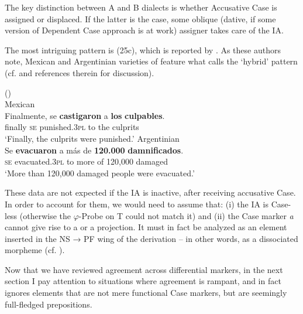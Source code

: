 \documentclass[output=paper]{langsci/langscibook}
\begin{document}


The key distinction between A and B dialects is whether Accusative Case is assigned or displaced. If the latter is the case, some oblique (dative, if some version of  Dependent Case approach is at work) assigner takes care of the IA.

The most intriguing pattern is (25c), which is reported by \citet{Ordóñez2007}. As these authors note, Mexican and Argentinian varieties of  feature what \citet{RAE-ASALE2009} calls the ‘hybrid’ pattern (cf. \citealt{Planells2017} and references therein for discussion).

\ea%
    (\citealt[12]{Ordóñez2007})\\
    \ea Mexican \label{ex:gallego:26}\\
    \gll Finalmente, se  \textbf{castigaron}       a  \textbf{los} \textbf{culpables}.        \\
         finally         \textsc{se}   punished.\textsc{3pl}   to the culprits\\
    \glt ‘Finally, the culprits were punished.’
    \ex Argentinian \\
    \gll Se  \textbf{evacuaron}    a más de \textbf{120.000} \textbf{damnificados}.              \\
         \textsc{se}   evacuated.\textsc{3pl} to more of 120,000 damaged\\
    \glt  ‘More than 120,000 damaged people were evacuated.’
    \z
\z

These data are not expected if the IA is inactive, after receiving accusative Case. In order to account for them, we would need to assume that: (i) the IA is Case-less (otherwise the $\varphi $-Probe on T could not match it) and (ii) the Case marker \textit{a} cannot give rise to a \CATPP or a \CATKP projection. It must in fact be analyzed as an element inserted in the NS → PF wing of the derivation – in other words, as a dissociated morpheme (cf. \citealt{Halle1993}).

  Now that we have reviewed agreement across differential markers, in the next section I pay attention to situations where agreement is rampant, and in fact ignores elements that are not mere functional Case markers, but are seemingly full-fledged prepositions.
\end{document}
